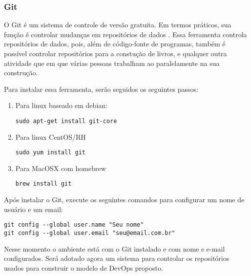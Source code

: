 \subsubsection{Git}

O Git é um sistema de controle de versão gratuita. 
Em termos práticos, sua função é controlar mudanças 
em repositórios de dados \cite{loeliger2012version}. Essa ferramenta controla 
repositórios de dados, pois, além de código-fonte de 
programas, também é possível controlar repositórios 
para a constução de livros, e qualquer outra 
atividade que em que várias pessoas trabalham ao 
paralelamente na sua construção.

Para instalar essa ferramenta, serão seguidos os 
seguintes passos:
  \begin{enumerate}
   \item Para linux baseado em debian:
      \begin{lstlisting}
sudo apt-get install git-core
      \end{lstlisting}
      
   \item Para linux CentOS/RH
      \begin{lstlisting}
sudo yum install git
      \end{lstlisting}
   
   \item Para MacOSX com homebrew
      \begin{lstlisting}
brew install git
      \end{lstlisting}
 \end{enumerate}
Após instalar o Git, execute os seguintes comandos 
para configurar um nome de usuário e um email: 
      \begin{lstlisting}
git config --global user.name "Seu nome"
git config --global user.email "seu@email.com.br"
      \end{lstlisting}
Nesse momento o ambiente está com o Git instalado 
e com nome e e-mail configurados. Será adotado 
agora um sistema para controlar os repositórios 
usados para construir o modelo de DevOps proposto.


